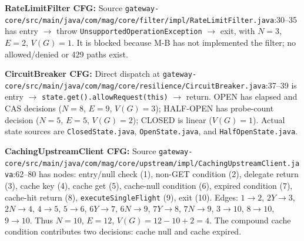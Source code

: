 \documentclass[11pt,a4paper]{article}
\newcommand{\evidence}[1]{\texttt{#1}}
\begin{document}
\textbf{RateLimitFilter CFG:} Source \evidence{gateway-core/src/main/java/com/mag/core/filter/impl/RateLimitFilter.java}:30--35 has entry $\rightarrow$ throw \texttt{UnsupportedOperationException} $\rightarrow$ exit, with $N=3$, $E=2$, $V(G)=1$. It is blocked because M-B has not implemented the filter; no allowed/denied or 429 paths exist.\par
\textbf{CircuitBreaker CFG:} Direct dispatch at \evidence{gateway-core/src/main/java/com/mag/core/resilience/CircuitBreaker.java}:37--39 is entry $\rightarrow$ \texttt{state.get().allowRequest(this)} $\rightarrow$ return. OPEN has elapsed and CAS decisions ($N=8$, $E=9$, $V(G)=3$); HALF-OPEN has probe-count decision ($N=5$, $E=5$, $V(G)=2$); CLOSED is linear ($V(G)=1$). Actual state sources are \evidence{ClosedState.java}, \evidence{OpenState.java}, and \evidence{HalfOpenState.java}.\par
\textbf{CachingUpstreamClient CFG:} Source \evidence{gateway-core/src/main/java/com/mag/core/upstream/impl/CachingUpstreamClient.java}:62--80 has nodes: entry/null check (1), non-GET condition (2), delegate return (3), cache key (4), cache get (5), cache-null condition (6), expired condition (7), cache-hit return (8), \texttt{executeSingleFlight} (9), exit (10). Edges: $1\rightarrow2$, $2Y\rightarrow3$, $2N\rightarrow4$, $4\rightarrow5$, $5\rightarrow6$, $6Y\rightarrow7$, $6N\rightarrow9$, $7Y\rightarrow8$, $7N\rightarrow9$, $3\rightarrow10$, $8\rightarrow10$, $9\rightarrow10$. Thus $N=10$, $E=12$, $V(G)=12-10+2=4$. The compound cache condition contributes two decisions: cache null and cache expired.
\end{document}

